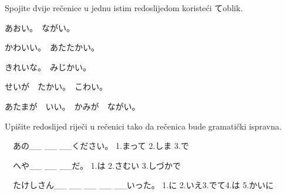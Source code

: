 

\author{Tomislav Mamić, Željka Ludošan}	%


	
	

	\begin{mondai}{Spojite dvije rečenice u jednu istim redoslijedom koristeći てoblik. 
		\begin{reibun}[Primjer:]
		\end{reibun} }

		\item あおい。　ながい。
		\item かわいい。　あたたかい。
		\item きれいな。　みじかい。
		\item せいが　たかい。　こわい。
		\item あたまが　いい。　かみが　ながい。　
		\vspace{-15pt} %
	\end{mondai}

	\begin{mondai}{Upišite redoslijed riječi u rečenici tako da rečenica bude gramatički ispravna. 
		\begin{reibun}[Primjer:]
		\end{reibun} }

		\item　あの\_\_ \_\_ \_\_ください。
		\vspace{10pt}
		\newline 1.まって 2.しま 3.で
		\vspace{20pt}
		\item　へや\_\_ \_\_ \_\_だ。
		\vspace{10pt}
		\newline 1.は 2.さむい 3.しづかで
		\vspace{20pt}
		\item　たけしさん\_\_ \_\_ \_\_ \_\_ \_\_いった。
		\vspace{10pt}
		\newline 1.に 2.いえ3.でて4.は 5.かいに
	\end{mondai}

